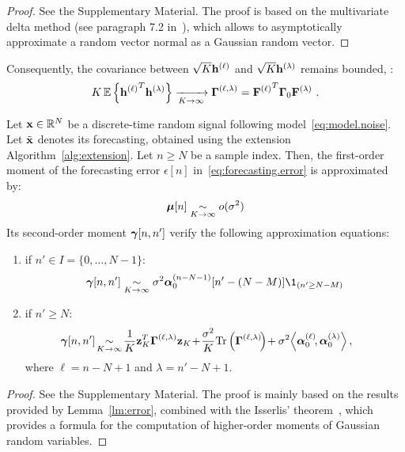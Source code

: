 \begin{proof}
See the Supplementary Material. The proof is based on the multivariate delta method (see paragraph 7.2 in~\cite{Alho05statistical}), which allows to asymptotically approximate a random vector normal as a Gaussian random vector.
\end{proof}

Consequently, the covariance between $\sqrt{K}{\mathbf h}^{(\ell)}$ and $\sqrt{K}{\mathbf h}^{(\lambda)}$ remains bounded, \ie:
\begin{equation*}
K\,{\mathbb E}\left\{{{\mathbf h}^{(\ell)}}^T{\mathbf h}^{(\lambda)}\right\} \xrightarrow[K\to\infty]{} \boldsymbol{\Gamma}^{(\ell,\lambda)} = {{\mathbf F}^{(\ell)}}^T\boldsymbol{\Gamma}_0{\mathbf F}^{(\lambda)}\ .
\end{equation*}

\begin{theorem}
\label{th:error}
Let ${\mathbf x}\in{\mathbb R}^N$ be a discrete-time random signal following model~\eqref{eq:model.noise}. Let $\tilde{{\mathbf x}}$ denotes its forecasting, obtained using the extension Algorithm~\ref{alg:extension}. Let $n\geq N$ be a sample index. Then, the first-order moment of the forecasting error $\epsilon[n]$ in~\eqref{eq:forecasting.error} is approximated by:
\begin{equation}
\bmu[n] \underset{K\to\infty}{\sim} o(\sigma^2)
\label{eq:mean.error}
\end{equation}
Its second-order moment $\boldsymbol{\gamma}[n,n']$ verify the following approximation equations:
\begin{enumerate}[label=(\roman*)]
\item if $n'\in I=\{0,\ldots,N-1\}$:
\begin{equation}
\bgamma[n,n']\underset{K\to\infty}{\sim} \sigma^2\balpha_0^{(n-N-1)}[n'-(N-M)]\1_{(n'\geq N-M)}
\label{eq:cov.error.1}
\end{equation}
\item if $n'\geq N$:
\begin{equation}
\hspace{-15pt}\bgamma[n,n']\!\underset{K\to\infty}{\sim}\!\frac1K\bz_K^T\bGamma^{(\ell,\lambda)}\bz_K \!+\! \dfrac{\sigma^2}{K}\Tr\left(\bGamma^{(\ell,\lambda)}\!\right)\! + \sigma^2\!\left\langle\balpha_0^{(\ell)}\!, \balpha_0^{(\lambda)}\right\rangle ,
\label{eq:cov.error.2}
\end{equation}
where $\ell=n-N+1$ and $\lambda=n'-N+1$.
\end{enumerate}
\end{theorem}

\begin{proof}
See the Supplementary Material. The proof is mainly based on the results provided by Lemma~\ref{lm:error}, combined with the Isserlis' theorem~\cite{Isserlis16formula}, which provides a formula for the computation of higher-order moments of Gaussian random variables.
\end{proof}

